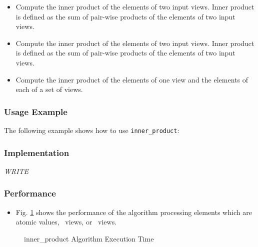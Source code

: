 \begin{itemize}
\item
Compute the inner product of the elements of two input views. Inner product is defined as the sum of pair-wise products of the elements of two input views. 
\item
Compute the inner product of the elements of two input views. Inner product is defined as the sum of pair-wise products of the elements of two input views. 
\item
Compute the inner product of the elements of one view and the elements of each of a set of views. 
\end{itemize}

\subsubsection{Usage Example} %

The following example shows how to use \texttt{inner\_product}:


\subsubsection{Implementation} %

\textit{WRITE}

\subsubsection{Performance} %

\begin{itemize}
\item
Fig. \ref{fig:inner-alg-exec-exper}
shows the performance of the algorithm processing
elements which are atomic values, \stl\ views, or \stapl\ views.
\end{itemize}

\begin{figure}[p]
\caption{inner\_product Algorithm Execution Time}
\label{fig:inner-alg-exec-exper}
\end{figure}

 
